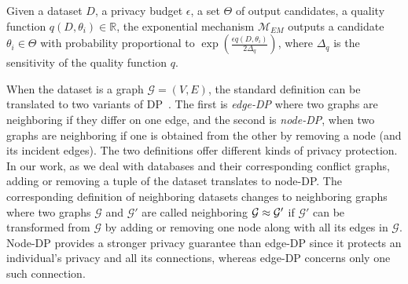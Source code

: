 \begin{definition}\label{def:EM}
Given a dataset $D$, a privacy budget $\epsilon$, a set $\Theta$ of output candidates, a quality function $q(D, \theta_i) \in \mathbb{R}$, the exponential mechanism $\mathcal{M}_{EM}$ outputs a candidate $\theta_i \in \Theta$ with probability proportional to $\exp \left(\frac{\epsilon q(D, \theta_i)}{2\Delta_q}\right)$, where $\Delta_q$ is the sensitivity of the quality function $q$.
\end{definition}





When the dataset is a graph $\mathcal{G} = (V, E)$, the standard definition can be translated to two variants of DP~\cite{hay2009accurate}. The first is \emph{edge-DP} where two graphs are neighboring if they differ on one edge, and the second is \emph{node-DP}, when two graphs are neighboring if one is obtained from the other by removing a node (and its incident edges). The two definitions offer different kinds of privacy protection.  In our work, as we deal with databases and their corresponding conflict graphs, adding or removing a tuple of the dataset translates to node-DP. The corresponding definition of neighboring datasets changes to neighboring graphs where two graphs $\mathcal{G}$ and $\mathcal{G}'$ are called neighboring $\mathcal{G} \approx \mathcal{G}^\prime$ if $\mathcal{G}'$ can be transformed from $\mathcal{G}$ by adding or removing one node along with all its edges in $\mathcal{G}$. Node-DP provides a stronger privacy guarantee than edge-DP since it protects an individual's privacy and all its connections, whereas edge-DP concerns only one such connection.  

